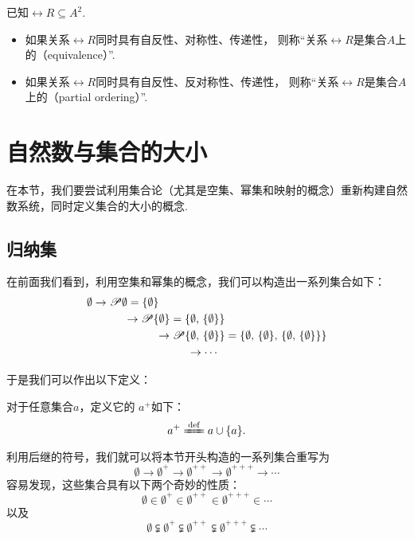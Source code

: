 \begin{definition}
已知\(\rel{R} \subseteq A^2\).
\begin{itemize}
	\item 如果关系\(\rel{R}\)同时具有自反性、对称性、传递性，
	则称“关系\(\rel{R}\)是集合\(A\)上的（equivalence）”.

	\item 如果关系\(\rel{R}\)同时具有自反性、反对称性、传递性，
	则称“关系\(\rel{R}\)是集合\(A\)上的（partial ordering）”.
\end{itemize}
\end{definition}



\section{自然数与集合的大小}
在本节，我们要尝试利用集合论（尤其是空集、幂集和映射的概念）重新构建自然数系统，同时定义集合的大小的概念.

\subsection{归纳集}
在前面我们看到，利用空集和幂集的概念，我们可以构造出一系列集合如下：
\[\begin{aligned}
\emptyset
&\to
\Powerset\emptyset = \NaturalSet{1} \\
&\hspace{1cm}\to
\Powerset\NaturalSet{1} = \NaturalSet{2} \\
&\hspace{2cm}\to
\Powerset\NaturalSet{2} = \NaturalSet{3} \\
&\hspace{3cm}\to
\dotsb
\end{aligned}\]

于是我们可以作出以下定义：
\begin{definition}[后继]\label{definition:集合论.后继的定义}
对于任意集合\(a\)，定义它的 \(a^+\)如下：\[
a^+ \defeq a \cup \{a\}.
\]
\end{definition}
利用后继的符号，我们就可以将本节开头构造的一系列集合重写为\[
\emptyset
\to \emptyset^+
\to \emptyset^{++}
\to \emptyset^{+++}
\to \dotsb
\]容易发现，这些集合具有以下两个奇妙的性质：\[
\emptyset
\in \emptyset^+
\in \emptyset^{++}
\in \emptyset^{+++}
\in \dotsb
\]以及\[
\emptyset
\subsetneqq \emptyset^+
\subsetneqq \emptyset^{++}
\subsetneqq \emptyset^{+++}
\subsetneqq \dotsb
\]

